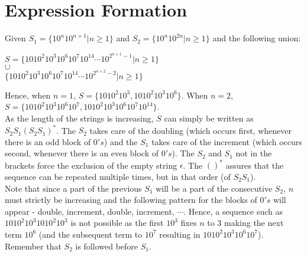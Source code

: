 \documentclass[11pt,letterpaper]{article}
\begin{document}
\section{Expression Formation}
Given $S_1 = \{ 10^{n}10^{n+1} | n \geq 1 \}$ and $S_2 = \{ 10^{n}10^{2n} | n \geq 1 \}$ and the following union:
\begin{center}
    $S = \{1010^{2}10^{3}10^{6}10^{7}10^{14}\cdots10^{2^{n+1}-1} | n \geq 1 \}$ \\
    $\cup$ \\
    $\{1010^{2}10^{3}10^{6}10^{7}10^{14}\cdots10^{2^{n+2}-2} | n \geq 1 \}$
\end{center}
Hence, when $n=1$, $S = \{1010^{2}10^{3}, 1010^{2}10^{3}10^{6}\}$. When $n=2$, $S = \{1010^{2}10^{3}10^{6}10^{7}, 1010^{2}10^{3}10^{6}10^{7}10^{14}\}$. \\
As the length of the strings is increasing, $S$ can simply be written as $S_2S_1(S_2S_1)^*$. The $S_2$ takes care of the doubling (which occurs first, whenever there is an odd block of $0's$) and the $S_1$ takes care of the increment (which occurs second, whenever there is an even block of $0's$). The $S_2$ and $S_1$ not in the brackets force the exclusion of the empty string $\epsilon$. The $()^*$ assures that the sequence can be repeated multiple times, but in that order (of $S_2S_1$). 
\\
Note that since a part of the previous $S_1$ will be a part of the consecutive $S_2$, $n$ must strictly be increasing and the following pattern for the blocks of $0's$ will appear - double, increment, double, increment, $\cdots$.
Hence, a sequence such as $1010^{2}10^{3}1010^{2}10^{3}$ is not possible as the first $10^{3}$ fixes $n$ to $3$ making the next term $10^{6}$ (and the subsequent term to $10^{7}$ resulting in $1010^{2}10^{3}10^{6}10^{7}$). Remember that $S_2$ is followed before $S_1$.
\end{document}
